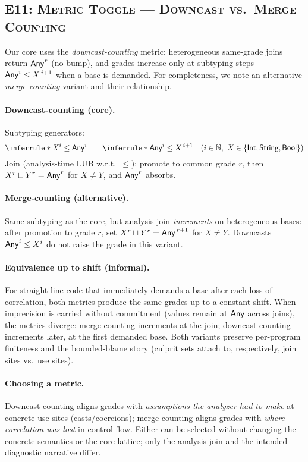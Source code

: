 \subsection{\textsc{E11: Metric Toggle — Downcast vs.\ Merge Counting}}

Our core uses the \emph{downcast-counting} metric:
heterogeneous same-grade joins return \(\mathsf{Any}^{r}\) (no bump), and grades increase only at subtyping steps \(\mathsf{Any}^{i}\le X^{\,i+1}\) when a base is demanded.
For completeness, we note an alternative \emph{merge-counting} variant and their relationship.

\paragraph{Downcast-counting (core).}
Subtyping generators:
\[
\inferrule*{ }{X^{i}\le \Any^{i}}
\qquad
\inferrule*{ }{\Any^{i}\le X^{\,i+1}}
\quad(i\in\mathbb{N},\ X\in\{\Int,\String,\Bool\})
\]
Join (analysis-time LUB w.r.t.\ \(\le\)): promote to common grade \(r\), then
\(X^{r}\sqcup Y^{r}=\mathsf{Any}^{r}\) for \(X\neq Y\), and \(\mathsf{Any}^{r}\) absorbs.

\paragraph{Merge-counting (alternative).}
Same subtyping as the core, but analysis join \emph{increments} on heterogeneous bases:
after promotion to grade \(r\), set \(X^{r}\sqcup Y^{r}=\mathsf{Any}^{\,r+1}\) for \(X\neq Y\).
Downcasts \(\mathsf{Any}^{i}\le X^{i}\) do not raise the grade in this variant.

\paragraph{Equivalence up to shift (informal).}
For straight-line code that immediately demands a base after each loss of correlation, both metrics produce the same grades up to a constant shift.
When imprecision is carried without commitment (values remain at \(\mathsf{Any}\) across joins), the metrics diverge:
merge-counting increments at the join; downcast-counting increments later, at the first demanded base.
Both variants preserve per-program finiteness and the bounded-blame story (culprit sets attach to, respectively, join sites vs.\ use sites).

\paragraph{Choosing a metric.}
Downcast-counting aligns grades with \emph{assumptions the analyzer had to make} at concrete use sites (casts/coercions);
merge-counting aligns grades with \emph{where correlation was lost} in control flow.
Either can be selected without changing the concrete semantics or the core lattice; only the analysis join and the intended diagnostic narrative differ.

